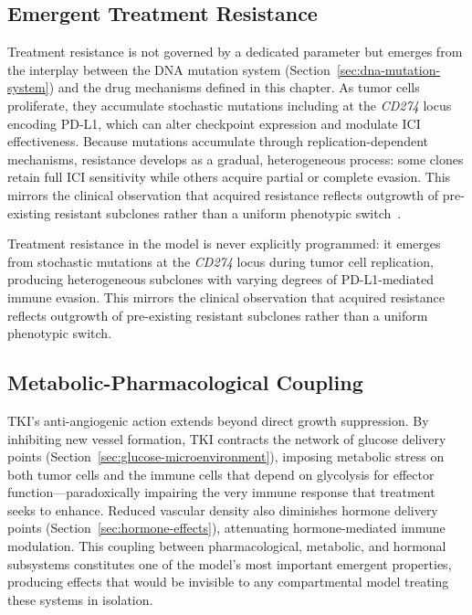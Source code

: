 \subsection{Emergent Treatment Resistance}

Treatment resistance is not governed by a dedicated parameter but emerges from the interplay between the DNA mutation system (Section~\ref{sec:dna-mutation-system}) and the drug mechanisms defined in this chapter. As tumor cells proliferate, they accumulate stochastic mutations including at the \textit{CD274} locus encoding PD-L1, which can alter checkpoint expression and modulate ICI effectiveness. Because mutations accumulate through replication-dependent mechanisms, resistance develops as a gradual, heterogeneous process: some clones retain full ICI sensitivity while others acquire partial or complete evasion. This mirrors the clinical observation that acquired resistance reflects outgrowth of pre-existing resistant subclones rather than a uniform phenotypic switch~\cite{Sharpe2018}.

\begin{keyfinding}
Treatment resistance in the model is never explicitly programmed: it emerges from stochastic mutations at the \textit{CD274} locus during tumor cell replication, producing heterogeneous subclones with varying degrees of PD-L1-mediated immune evasion. This mirrors the clinical observation that acquired resistance reflects outgrowth of pre-existing resistant subclones rather than a uniform phenotypic switch.
\end{keyfinding}

\subsection{Metabolic-Pharmacological Coupling}

TKI's anti-angiogenic action extends beyond direct growth suppression. By inhibiting new vessel formation, TKI contracts the network of glucose delivery points (Section~\ref{sec:glucose-microenvironment}), imposing metabolic stress on both tumor cells and the immune cells that depend on glycolysis for effector function---paradoxically impairing the very immune response that treatment seeks to enhance. Reduced vascular density also diminishes hormone delivery points (Section~\ref{sec:hormone-effects}), attenuating hormone-mediated immune modulation. This coupling between pharmacological, metabolic, and hormonal subsystems constitutes one of the model's most important emergent properties, producing effects that would be invisible to any compartmental model treating these systems in isolation.

